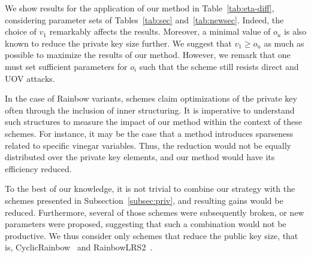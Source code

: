 \documentclass[12pt, a4paper, oneside]{memoir}
\theoremstyle{definition}
\begin{document}
We show results for the application of our method in Table~\ref{tab:eta-diff}, considering parameter sets of Tables~\ref{tab:sec} and~\ref{tab:newsec}. Indeed, the choice of $v_{1}$ remarkably affects the results. Moreover, a minimal value of $o_{u}$ is also known to reduce the private key size further. We suggest that $v_{1} \geq o_{u}$ as much as possible to maximize the results of our method. However, we remark that one must set sufficient parameters for $o_{i}$ such that the scheme still resists direct and UOV attacks.

In the case of Rainbow variants, schemes claim optimizations of the private key often through the inclusion of inner structuring. It is imperative to understand such structures to measure the impact of our method within the context of these schemes. For instance, it may be the case that a method introduces sparseness related to specific vinegar variables. Thus, the reduction would not be equally distributed over the private key elements, and our method would have its efficiency reduced.

To the best of our knowledge, it is not trivial to combine our strategy with the schemes presented in Subsection~\ref{subsec:priv}, and resulting gains would be reduced. Furthermore, several of those schemes were subsequently broken, or new parameters were proposed, suggesting that such a combination would not be productive. We thus consider only schemes that reduce the public key size, that is, CyclicRainbow~\cite{Petzoldt:201012} and RainbowLRS2~\cite[Sec.~9.2]{Petzoldt:201307}.
\end{document}
